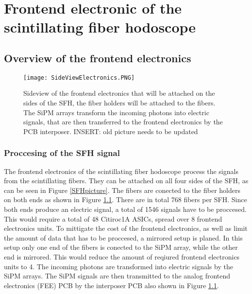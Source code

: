 \chapter{Frontend electronic of the scintillating fiber hodoscope}\label{cha:frontend}


\section{Overview of the frontend electronics}
\begin{figure}[h]
    \centering
    \texttt{[image: SideViewElectronics.PNG]}
    \caption{Sideview of the frontend electronics that will be attached on the sides of the SFH, the fiber holders will be attached to the fibers.
     The SiPM arrays transform the incoming photons into  electric signals, that are then transferred to the frontend electronics by the PCB interposer.\autocite{InternalcommunicationKarl} INSERT: old picture needs to be updated}
    \label{fig:SideviewModelElectronics}
    \end{figure}
\subsection{Proccesing of the SFH signal}
The frontend electronics of the scintillating fiber hodoscope process the signals from the scintillating fibers.
They can be attached on all four sides of the SFH, as can be seen in Figure \ref{SFHpicture}.
The fibers are conected to the fiber holders on both ends as shown in Figure \ref{fig:SideviewModelElectronics}. 
There are in total 768\autocite{Amber2022Status} fibers per SFH. Since both ends produce an electric signal,
 a total of 1546 signals have to be proccesed. This would require a total of 48 Citiroc1A ASICs, spread over 8 frontend electronics units. 
 To mittigate the cost of the frontend electronics, as well as limit the amount of data that has to be proccesed, a mirrored setup is planed.
 In this setup only one end of the fibers is conected to the SiPM array, while the other end is mirrored. This would reduce the amount of reqiured frontend electronics units to 4.\autocite{InternalcommunicationKarl}
 \newline
 The incoming photons are transformed into electric signals by the SiPM arrays.
 The SiPM signals are then transmitted to the analog frontend electronics (FEE) PCB by the interposer PCB also shown in Figure \ref{fig:SideviewModelElectronics}.\autocite{InternalcommunicationKarl}
